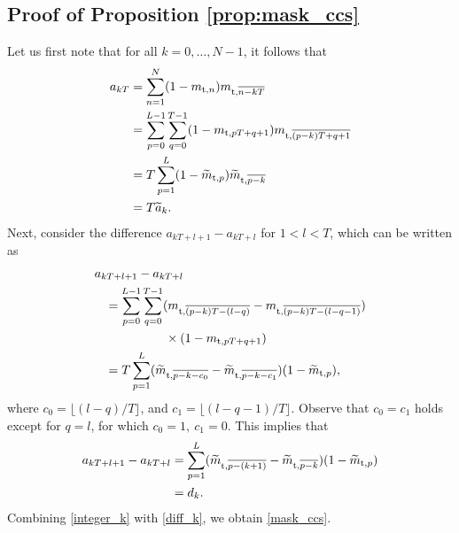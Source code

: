 \documentclass[journal,a4paper,10pt, romanappendices]{IEEEtran}
\begin{document}
\subsection{Proof of Proposition \ref{prop:mask_ccs}}\label{sec:proof_mask_ccs}
\begin{IEEEproof}
Let us first note that for all $k=0,\dotsc,N-1$, it follows that
\begin{align}\label{integer_k}
a_{kT} &= \sum_{n=1}^N (1-m_{{\rm t},n})m_{{\rm t},\overline{n-kT}}\nonumber\\
&=\sum_{p=0}^{L-1} \sum_{q=0}^{T-1}(1-m_{{\rm t},pT+q+1})m_{{\rm t},\overline{(p-k)T+q+1}}\nonumber\\
&=T\sum_{p=1}^{L}(1-\widetilde{m}_{{\rm t},p})\widetilde{m}_{{\rm t},\overline{p-k}}\nonumber\\
&=T\widetilde{a}_k.
\end{align}
Next, consider the difference $a_{kT+l+1}-a_{kT+l}$ for $1<l<T$, which can be written as
\begin{align}
&a_{kT+l+1}-a_{kT+l} \nonumber\\
&\hspace{3mm}= \sum_{p=0}^{L-1}\sum_{q=0}^{T-1} (m_{{\rm t},\overline{(p-k)T-(l-q)}} - m_{{\rm t},\overline{(p-k)T-(l-q-1)}}) \nonumber \\
&\hspace{20mm}\times (1-m_{{\rm t},pT+q+1})\nonumber \\
&\hspace{3mm}=T\sum_{p=1}^{L} (\widetilde{m}_{{\rm t},\overline{p-k-c_0}} - \widetilde{m}_{{\rm t},\overline{p-k-c_1}})(1-\widetilde{m}_{{\rm t},p}),
\end{align}
where $c_0=\lfloor(l-q)/T\rfloor$, and $c_1=\lfloor(l-q-1)/T\rfloor$. Observe that $c_0=c_1$ holds except for $q=l$, for which $c_0=1,~c_1=0$. This implies that
\begin{align}\label{diff_k}
a_{kT+l+1}-a_{kT+l}&= \sum_{p=1}^{L} (\widetilde{m}_{{\rm t},\overline{p-(k+1)}} - \widetilde{m}_{{\rm t},\overline{p-k}})(1-\widetilde{m}_{{\rm t},p})\nonumber \\
&=d_k.
\end{align}
Combining \eqref{integer_k} with \eqref{diff_k}, we obtain \eqref{mask_ccs}.
\end{IEEEproof}



\end{document}
